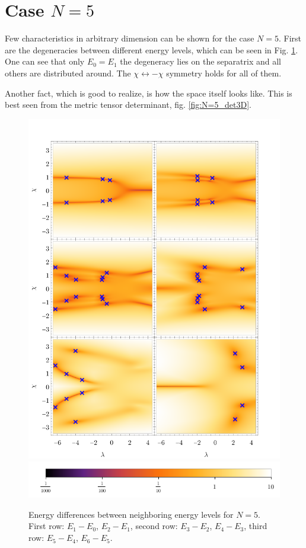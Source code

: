 \section{Case $N=5$}

Few characteristics in arbitrary dimension can be shown for the case $N=5$. First are the degeneracies between different energy levels, which can be seen in Fig. \ref{fig:singularitiesBetweenEnergiesN=6}. One can see that only $E_0=E_1$ the degeneracy lies on the separatrix and all others are distributed around. The $\chi\leftrightarrow-\chi$ symmetry holds for all of them. 

Another fact, which is good to realize, is how the space itself looks like. This is best seen from the metric tensor determinant, fig. \ref{fig:N=5_det3D}.



\begin{figure}[H]
    \centering
    \includegraphics[scale=1.3]{../img/singularitiesBetweenEnergiesN=6.pdf}
    \includegraphics[scale=1.3]{../img/N=5_bar6.pdf}
    \caption{Energy differences between neighboring energy levels for $N=5$. First row: $E_1-E_0$, $E_2-E_1$, second row: $E_3-E_2$, $E_4-E_3$, third row: $E_5-E_4$, $E_6-E_5$.}
    \label{fig:singularitiesBetweenEnergiesN=6}    
\end{figure}

